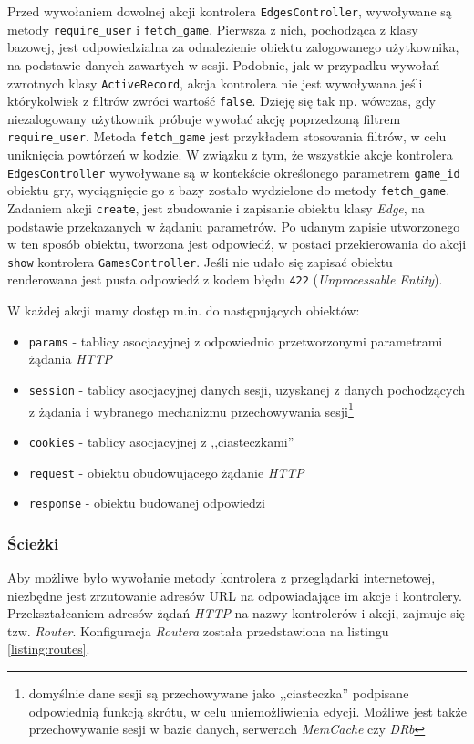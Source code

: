 \documentclass[a4paper,12pt]{article}
\begin{document}
Przed wywołaniem dowolnej akcji kontrolera \texttt{EdgesController},
wywoływane są metody \texttt{require\_user} i
\texttt{fetch\_game}. Pierwsza z nich, pochodząca z klasy bazowej,
jest odpowiedzialna za odnalezienie obiektu zalogowanego użytkownika,
na podstawie danych zawartych w sesji. Podobnie, jak w przypadku
wywołań zwrotnych klasy \texttt{ActiveRecord}, akcja kontrolera nie
jest wywoływana jeśli którykolwiek z filtrów zwróci wartość
\texttt{false}. Dzieję się tak np. wówczas, gdy niezalogowany
użytkownik próbuje wywołać akcję poprzedzoną filtrem
\texttt{require\_user}. Metoda \texttt{fetch\_game} jest przykładem
stosowania filtrów, w celu uniknięcia powtórzeń w kodzie. W związku z
tym, że wszystkie akcje kontrolera \texttt{EdgesController} wywoływane
są w kontekście określonego parametrem \texttt{game\_id} obiektu gry,
wyciągnięcie go z bazy zostało wydzielone do metody
\texttt{fetch\_game}. Zadaniem akcji \texttt{create}, jest zbudowanie
i zapisanie obiektu klasy \emph{Edge}, na podstawie przekazanych w
żądaniu parametrów. Po udanym zapisie utworzonego w ten sposób
obiektu, tworzona jest odpowiedź, w postaci przekierowania do akcji
\texttt{show} kontrolera \texttt{GamesController}. Jeśli nie udało się
zapisać obiektu renderowana jest pusta odpowiedź z kodem błędu
\texttt{422} (\emph{Unprocessable Entity}).

W każdej akcji mamy dostęp m.in. do następujących obiektów:

\begin{itemize}
\item \texttt{params} - tablicy asocjacyjnej z odpowiednio
  przetworzonymi parametrami żądania \emph{HTTP}
\item \texttt{session} - tablicy asocjacyjnej danych sesji, uzyskanej
  z danych pochodzących z żądania i wybranego mechanizmu
  przechowywania sesji\footnote{domyślnie dane sesji są przechowywane
    jako ,,ciasteczka'' podpisane odpowiednią funkcją skrótu, w celu
    uniemożliwienia edycji. Możliwe jest także przechowywanie sesji w
    bazie danych, serwerach \emph{MemCache} czy \emph{DRb}}
\item \texttt{cookies} - tablicy asocjacyjnej z ,,ciasteczkami''
\item \texttt{request} - obiektu obudowującego żądanie \emph{HTTP}
\item \texttt{response} - obiektu budowanej odpowiedzi
\end{itemize}

\subsubsection{Ścieżki}\label{sec:routes}
Aby możliwe było wywołanie metody kontrolera z przeglądarki
internetowej, niezbędne jest zrzutowanie adresów URL na odpowiadające
im akcje i kontrolery. Przekształcaniem adresów żądań \emph{HTTP} na
nazwy kontrolerów i akcji, zajmuje się
tzw. \emph{Router}. Konfiguracja \emph{Routera} została przedstawiona
na listingu \ref{listing:routes}.
\end{document}
